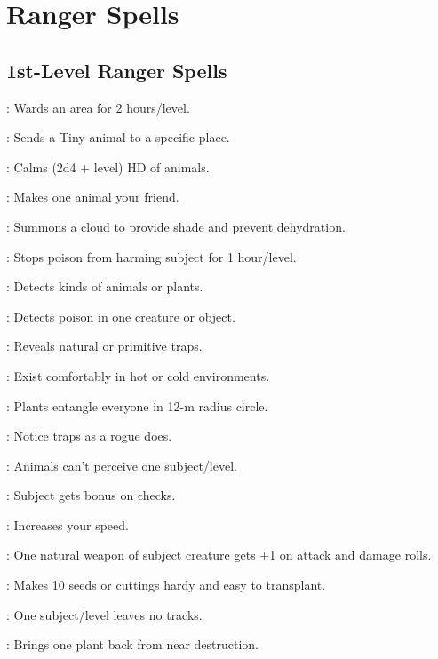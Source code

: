\section{Ranger Spells}



\subsection{1st-Level Ranger Spells}

: Wards an area for 2 hours/level.

: Sends a Tiny animal to a specific place.

: Calms (2d4 + level) HD of animals.

: Makes one animal your friend.

: Summons a cloud to provide shade and prevent dehydration. %

: Stops poison from harming subject for 1 hour/level.

: Detects kinds of animals or plants.

: Detects poison in one creature or object.

: Reveals natural or primitive traps.

: Exist comfortably in hot or cold environments.

: Plants entangle everyone in 12-m radius circle.

: Notice traps as a rogue does.

: Animals can't perceive one subject/level.

: Subject gets bonus on  checks.

: Increases your speed.

: One natural weapon of subject creature gets +1 on attack and damage rolls.

: Makes 10 seeds or cuttings hardy and easy to transplant. %

: One subject/level leaves no tracks.

: Brings one plant back from near destruction. %

